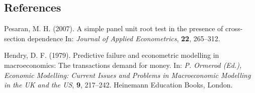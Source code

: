 \documentclass[12pt]{article}
\begin{document}
%        
%
%        

\subsection*{References}

\begin{description}


\item
Pesaran, M. H. (2007).
A simple panel unit root test in the presence of cross-section dependence
In: \textit{Journal of
Applied Econometrics}, 
\textbf{22}, 265--312.

\item
Hendry, D. F. (1979). 
Predictive failure and econometric modelling in macroeconomics: The transactions
demand for money. 
In: \textit{P. Ormerod (Ed.), Economic Modelling: Current Issues and Problems in
Macroeconomic Modelling in the UK and the US}, 
\textbf{9}, 217--242.
Heinemann Education Books,
London.


\end{description}
\end{document}
